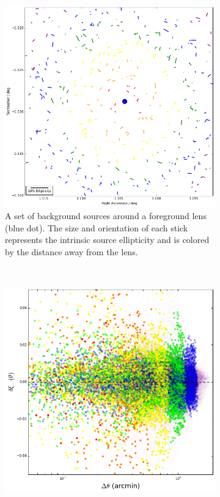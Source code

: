 \documentclass[%
 reprint,
 amsmath,amssymb,
 aps,nofootinbib
]{revtex4-1}
\begin{document}
\begin{figure}
    \centering
    \begin{subfigure}{0.425\textwidth}
        \includegraphics[width=\textwidth]{figs-swe/corr_visualization_unlensed.png}
        \captionsetup{justification=raggedright,singlelinecheck=false}
        \caption{A set of background sources around a foreground lens (blue dot). The size and orientation of each stick represents the intrinsic source ellipticity and is colored by the distance away from the lens.}
        \label{color_corr_unlensed}
    \end{subfigure}
    ~
    \begin{subfigure}{0.425\textwidth}
        \includegraphics[width=\textwidth]{figs-swe/corr_dist_unlensed.png}

\end{subfigure}
\end{figure}
\end{document}
